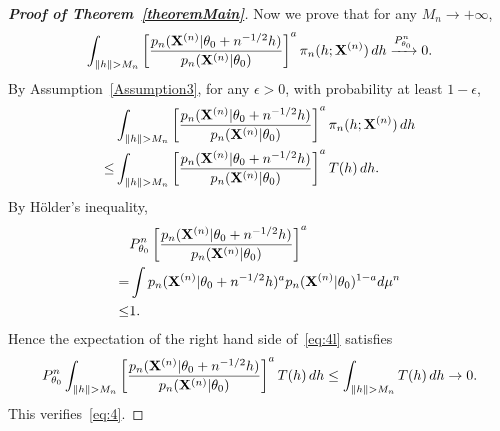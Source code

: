 \documentclass[11pt]{article}
\theoremstyle{plain}
\theoremstyle{definition}
\theoremstyle{remark}
\begin{document}
\begin{appendices}
\begin{proof}[\textbf{Proof of Theorem~\ref{theoremMain}}]
Now we prove that for any $M_n\to +\infty$,
\begin{equation}\label{eq:4}
    \int_{\|h\|> M_n}\left[\frac{p_n(\BX^{(n)}|\theta_0+n^{-1/2}h)}{p_n(\BX^{(n)}|\theta_0)}\right]^{a} \pi_n(h;\BX^{(n)})\, dh
    \xrightarrow{P_{\theta_0}^n}0.
\end{equation}
By Assumption~\ref{Assumption3}, for any $\epsilon>0$, with probability at least $1-\epsilon$,
\begin{equation}\label{eq:4l}
    \begin{split}
    &\int_{\|h\|> M_n}\left[\frac{p_n(\BX^{(n)}|\theta_0+n^{-1/2}h)}{p_n(\BX^{(n)}|\theta_0)}\right]^{a} \pi_n(h;\BX^{(n)})\, dh
    \\
    \leq&
    \int_{\|h\|> M_n}\left[\frac{p_n(\BX^{(n)}|\theta_0+n^{-1/2}h)}{p_n(\BX^{(n)}|\theta_0)}\right]^{a} T(h)\, dh.
    \end{split}
\end{equation}
By  H\"older's inequality, 
\begin{equation*}
    \begin{split}
    &P^n_{\theta_0}\left[\frac{p_n(\mathbf{X}^{(n)}|\theta_0+n^{-1/2}h)}{p_n(\mathbf{X}^{(n)}|\theta_0)}\right]^{a}
    \\
    =&
    \int p_n(\mathbf{X}^{(n)}|\theta_0+n^{-1/2}h)^a p_n(\mathbf{X}^{(n)}|\theta_0)^{1-a} d\mu^n
    \\
    \leq& 1.
    \end{split}
\end{equation*}
Hence the expectation of the right hand side of~\eqref{eq:4l} satisfies
\begin{equation*}
   P^n_{\theta_0} \int_{\|h\|> M_n}\left[\frac{p_n(\BX^{(n)}|\theta_0+n^{-1/2}h)}{p_n(\BX^{(n)}|\theta_0)}\right]^{a} T(h)\, dh
   \leq
   \int_{\|h\|> M_n} T(h)\, dh\to 0.
\end{equation*}
This verifies~\eqref{eq:4}.


\end{proof}
\end{appendices}
\end{document}
